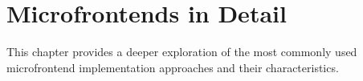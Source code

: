 \chapter{Microfrontends in Detail}
\label{chap:MicrofrontendsInDetail}
This chapter provides a deeper exploration of the most commonly used microfrontend implementation approaches and their characteristics.


